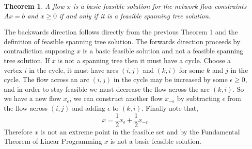 \documentclass[12pt]{amsart}
\newtheorem{theorem}{Theorem}
\begin{document}
\begin{theorem} A flow $x$ is a basic feasible solution for the network flow constraints $Ax = b$ and $ x \geq 0$ if and only if it is a feasible spanning tree solution.  
\end{theorem}
The backwards direction follows directly from the previous Theorem 1 and the definition of feasible spanning tree solution. The forwards direction proceeds by contradiction supposing 
$x$ is a basic feasible solution and not a feasible spanning tree solution. If 
$x$ is not a spanning tree then it must have a cycle. Choose a vertex $i$ in the cycle, it must have arcs $(i, j)$ and $(k, i)$ for some $k$ and $j$ in the cycle.
The flow across an arc $(i, j)$ in the cycle may be increased by some $\epsilon \geq 0$, and in order to stay feasible we must decrease the flow across the arc $(k, i)$. 
So we have a new flow $x_\epsilon$, we can construct another flow $x_{-\epsilon}$ by subtracting $\epsilon$ from the flow across $(i, j)$ and adding $\epsilon$ to $(k, i)$.
Finally note that, 
\begin{equation*}
    x = \frac{1}{2}x_{\epsilon} + \frac{1}{2}x_{-\epsilon}.
\end{equation*}
Therefore $x$ is not an extreme point in the feasible set and by the Fundamental Theorem of Linear Programming $x$ is not a basic feasible solution. 
\end{document}
